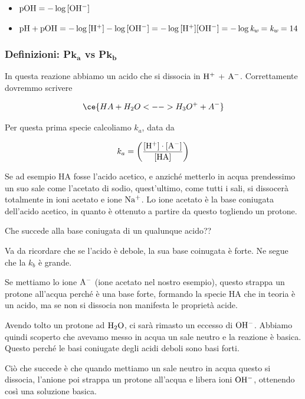 \begin{itemize}
    \item $\rm pOH=-\log{[OH^-]}$
    \item $\rm pH + pOH=-\log{[H^+]} - \log{[OH^-]}=-\log{[H^+][OH^-]}=-\log{\textit{k}_{\textit{w}}}=\textit{k}_{\textit{w}}=14$
\end{itemize}

\subsubsection{Definizioni: P$\boldsymbol{k_a}$ vs P$\boldsymbol{k_b}$}


In questa reazione abbiamo un acido che si dissocia in $\rm H^+$ + $\rm A^-$. Correttamente dovremmo scrivere

$$\ce{HA + H_2O <--> H_3O^+ + A^-}$$

Per questa prima specie calcoliamo $k_a$, data da

$$k_a = \left( \rm \frac{[H^+] \cdot [A^-]}{[HA]} \right)$$

Se ad esempio HA fosse l'acido acetico, e anziché metterlo in acqua prendessimo un suo sale come l'acetato di sodio, quest'ultimo, come tutti i sali, si dissocerà totalmente in ioni acetato e ione $\rm Na^+$. Lo ione acetato è la base coniugata dell'acido acetico, in quanto è ottenuto a partire da questo togliendo un protone.

Che succede alla base coniugata di un qualunque acido??

Va da ricordare che se l'acido è debole, la sua base coinugata è forte. Ne segue che la $k_b$ è grande.

\vspace{0.2cm}

\vspace{0.2cm}Se mettiamo lo ione $\rm A^-$ (ione acetato nel nostro esempio), questo strappa un protone all'acqua perché è una base forte, formando la specie HA che in teoria è un acido, ma se non si dissocia non manifesta le proprietà acide.

Avendo tolto un protone ad $\rm H_2O$, ci sarà rimasto un eccesso di $\rm OH^-$. Abbiamo quindi scoperto che avevamo messo in acqua un sale neutro e la reazione è basica. Questo perché le basi coniugate degli acidi deboli sono basi forti.

Ciò che succede è che quando mettiamo un sale neutro in acqua questo si dissocia, l'anione poi strappa un protone all'acqua e libera ioni $\rm OH^-$, ottenendo così una soluzione basica.

